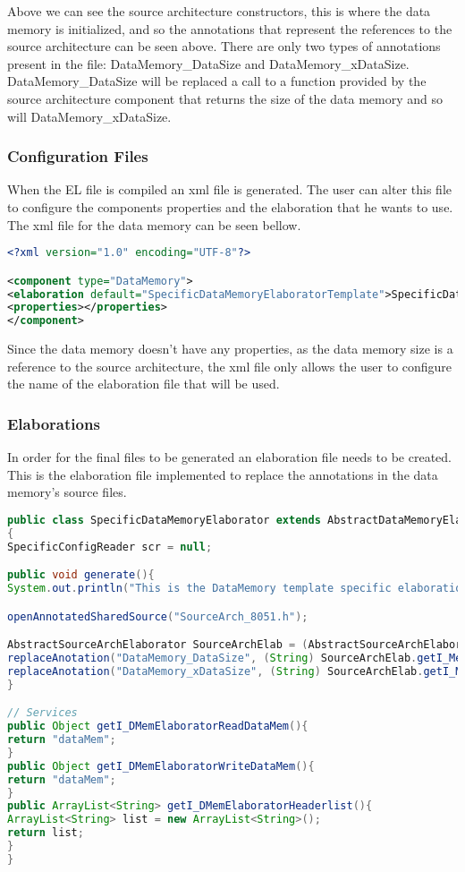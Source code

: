 Above we can see the source architecture constructors, this is where the data memory is initialized, and so the annotations that represent the references to the source architecture can be seen above. There are only two types of annotations present in the file: DataMemory\_DataSize and DataMemory\_xDataSize. DataMemory\_DataSize will be replaced a call to a function provided by the source architecture component that returns the size of the data memory and so will DataMemory\_xDataSize.



			
\subsubsection{Configuration Files}
When the EL file is compiled an xml file is generated. The user can alter this file to configure the components properties and the elaboration that he wants to use. The xml file for the data memory can be seen bellow.
\begin{lstlisting}[caption={Data Memory xml file}, label={lst:DMemxml},language=xml]
<?xml version="1.0" encoding="UTF-8"?>

<component type="DataMemory">
<elaboration default="SpecificDataMemoryElaboratorTemplate">SpecificDataMemoryElaborator</elaboration>
<properties></properties>
</component>
\end{lstlisting}
Since the data memory doesn't have any properties, as the data memory size is a reference to the source architecture, the xml file only allows the user to configure the name of the elaboration file that will be used. 

				
\subsubsection{Elaborations}
In order for the final files to be generated an elaboration file needs to be created. This is the elaboration file implemented to replace the annotations in the data memory's source files.
\begin{lstlisting}[caption={Data Memory Elaboration}, label={lst:DMemElab},language=java]
public class SpecificDataMemoryElaborator extends AbstractDataMemoryElaborator 
{
SpecificConfigReader scr = null;

public void generate(){
System.out.println("This is the DataMemory template specific elaboration.");

openAnnotatedSharedSource("SourceArch_8051.h");   

AbstractSourceArchElaborator SourceArchElab = (AbstractSourceArchElaborator) getElaborator((_SourceArch) target.get_r_MemSizes());
replaceAnotation("DataMemory_DataSize", (String) SourceArchElab.getI_MemSizesElaboratorDataMemSize());
replaceAnotation("DataMemory_xDataSize", (String) SourceArchElab.getI_MemSizesElaboratorXDataMemSize());
}

// Services 
public Object getI_DMemElaboratorReadDataMem(){
return "dataMem";
}
public Object getI_DMemElaboratorWriteDataMem(){
return "dataMem";
}
public ArrayList<String> getI_DMemElaboratorHeaderlist(){
ArrayList<String> list = new ArrayList<String>();
return list;
}
}
\end{lstlisting}

